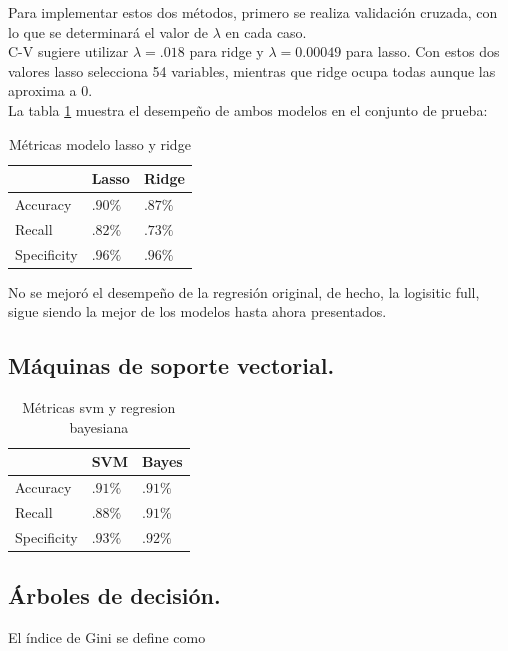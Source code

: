 \documentclass[12pt, letterpaper]{article}
\begin{document}
Para implementar estos dos métodos, primero se realiza validación cruzada, con lo que se determinará el valor de $\lambda$ en cada caso. \\

C-V sugiere utilizar $\lambda=.018$ para ridge y $\lambda=0.00049$ para lasso. Con estos dos valores lasso selecciona 54 variables, mientras que ridge ocupa todas aunque las aproxima a 0.\\

La tabla \ref{lasso} muestra el desempeño de ambos modelos en el conjunto de prueba:

\begin{table}[ht]
\centering
\begin{tabular}{|l|l|l|}
\hline
&Lasso&Ridge\\
\hline\hline
Accuracy& $.90\%$ & $.87 \%$ \\ \hline
Recall & $.82\%$ & $.73 \%$ \\ \hline
Specificity & $.96\%$ & $.96 \%$ \\ \hline
\end{tabular}
\caption{Métricas modelo lasso y ridge}
\label{lasso}
\end{table}

No se mejoró el desempeño de la regresión original, de hecho, la logisitic full, sigue siendo la mejor de los modelos hasta ahora presentados.
\subsection{Máquinas de soporte vectorial.}

\begin{table}[ht]
\centering
\begin{tabular}{|l|l|l|}
\hline
&SVM&Bayes\\
\hline\hline
Accuracy& $.91\%$ & $.91 \%$ \\ \hline
Recall & $.88\%$ & $.91 \%$ \\ \hline
Specificity & $.93\%$ & $.92 \%$ \\ \hline
\end{tabular}
\caption{Métricas svm y regresion bayesiana}
\label{svm}
\end{table}



\subsection{Árboles de decisión.}

El índice de Gini se define como 
\end{document}
